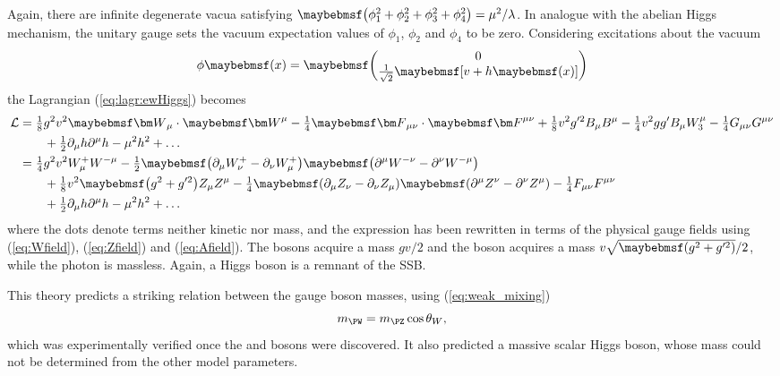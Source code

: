 Again, there are infinite degenerate vacua satisfying 
$\parenths{\phi_1^2 + \phi_2^2 + \phi_3^2 + \phi_4^2} = \mu^2/\lambda$. In analogue with 
the abelian Higgs mechanism, the unitary gauge sets the vacuum expectation values of 
$\phi_1$, $\phi_2$ and $\phi_4$ to be zero. Considering excitations about the vacuum
\begin{equation}
	\phi\parenths{x} = \colvector{0\\ \frac{1}{\sqrt{2}} 
	\sqbracs{v + h\parenths{x}}} \label{eq:higgs_doublet}
\end{equation}
the Lagrangian (\ref{eq:lagr:ewHiggs}) becomes
\begin{align}
	\mathcal{L} &= \tfrac{1}{8} g^2 v^2 \bvec{W}_{\mu} \cdot \bvec{W}^{\mu} - \tfrac{1}{4} \bvec{F}_{\mu\nu} \cdot \bvec{F}^{\mu\nu} + \tfrac{1}{8} v^2 g'^2 B_{\mu} B^{\mu} - \tfrac{1}{4} v^2 gg' B_{\mu} W_{3}^{\mu} - \tfrac{1}{4} G_{\mu\nu} G^{\mu\nu} \nonumber \\
	&\quad\quad {} + \tfrac{1}{2} \partial_{\mu}h \partial^{\mu}h - \mu^2 h^2 + \dots \\
	&= \tfrac{1}{4} g^2 v^2 W^{+}_{\mu} W^{-\mu} - \tfrac{1}{2} \parenths{\partial_{\mu}W^{+}_{\nu} - \partial_{\nu}W^{+}_{\mu}} \parenths{\partial^{\mu}W^{-\nu} - \partial^{\nu}W^{-\mu}} \nonumber \\
	&\quad\quad {} + \tfrac{1}{8} v^2 \parenths{g^2 + g'^2} Z_{\mu} Z^{\mu} - \tfrac{1}{4} \parenths{\partial_{\mu}Z_{\nu} - \partial_{\nu}Z_{\mu}} \parenths{\partial^{\mu}Z^{\nu} - \partial^{\nu}Z^{\mu}} - \tfrac{1}{4} F_{\mu\nu} F^{\mu\nu} \nonumber \\
	&\quad\quad {} + \tfrac{1}{2} \partial_{\mu}h \partial^{\mu}h - \mu^2 h^2 + \dots
\end{align}
where the dots denote terms neither kinetic nor mass, and the expression has been rewritten in terms of the physical gauge fields using (\ref{eq:Wfield}), (\ref{eq:Zfield})
and (\ref{eq:Afield}). The \PWpm bosons acquire a mass $gv/2$ and the \PZ boson acquires a
mass $v \sqrt{\parenths{g^2+g'^2}}/2$, while the photon is massless. Again, a Higgs boson
is a remnant of the \ac{SSB}.

This theory predicts a striking relation between the gauge boson masses, using 
(\ref{eq:weak_mixing})
\begin{equation}
	m_{\PW} = m_{\PZ} \cos\theta_W ,
\end{equation}
which was experimentally verified once the \PW and \PZ bosons were discovered. It also 
predicted a massive scalar Higgs boson, whose mass could not be determined from the other 
model parameters.

